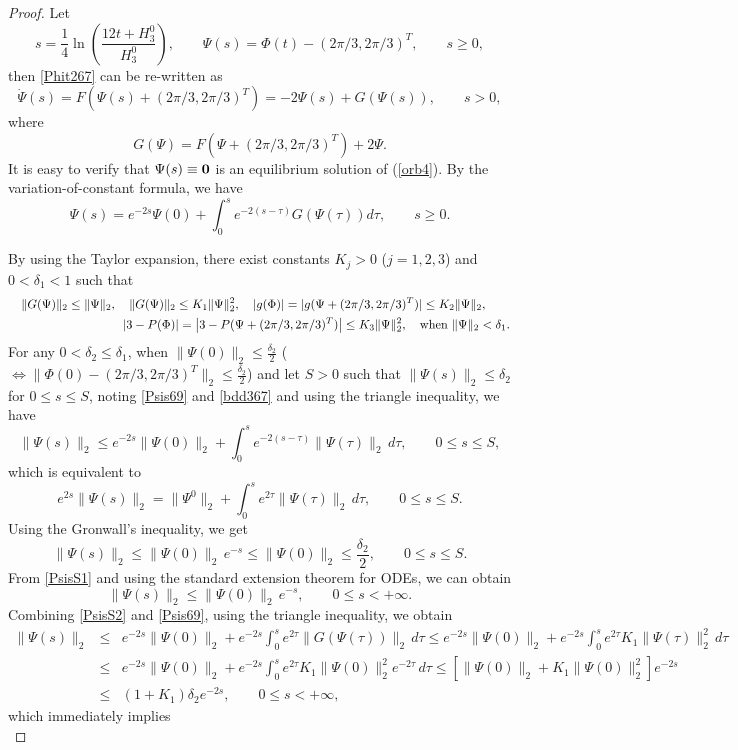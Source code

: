 \documentclass{aims}
\theoremstyle{plain}
\theoremstyle{definition}
\newcommand{\nn}{\nonumber}
\newcommand{\be} {\begin{equation}}
\newcommand{\ee}{\end{equation}}
\newcommand{\bea}{\begin{eqnarray}}
\newcommand{\eea}{\end{eqnarray} }
\begin{document}
\begin{proof}
Let
\be\label{st98}
s=\frac{1}{4}\ln \left(\frac{12t+H_3^0}{H_3^0}\right),\qquad
\Psi(s)=\Phi(t)-(2\pi/3,2\pi/3)^T, \qquad s\ge0,
\ee
then \eqref{Phit267} can be re-written as
\be\label{orb4}
\dot\Psi(s)=F\left(\Psi(s)+(2\pi/3,2\pi/3)^T\right)=-2 \Psi(s)+G(\Psi(s)),
\qquad s>0,
\ee
where
\be
G(\Psi)=F\left(\Psi+(2\pi/3,2\pi/3)^T\right)+2\Psi.\nonumber
\ee
It is easy to verify that $\Psi(s)\equiv {\bf 0}$ is
an equilibrium solution of (\ref{orb4}). By the variation-of-constant formula, we have
\be\label{Psis69}
\Psi(s)=e^{-2s}\Psi(0)+\int_0^s e^{-2(s-\tau)}
G(\Psi(\tau))d\tau, \qquad s\ge0.
\ee

By using the Taylor expansion, there exist constants $K_j>0$ ($j=1,2,3$) and $0<\delta_1<1$  such that
\bea\label{bdd367}
&&\|G(\Psi)\|_2\leq \|\Psi\|_2,\quad
\|G(\Psi)\|_2\leq K_1\|\Psi\|_2^2, \quad
|g(\Phi)|=|g(\Psi+(2\pi/3,2\pi/3)^T)|\leq K_2\|\Psi\|_2,\qquad \\
\label{bdd3671}
&&\left|3-P(\Phi)\right|=\left|3-P(\Psi+(2\pi/3,2\pi/3)^T)\right|\leq K_3\|\Psi\|_2^2, \quad \hbox{when}\ \|\Psi\|_2<\delta_1.
\eea
For any $0<\delta_2\le \delta_1$, when $\|\Psi(0)\|_2\le \frac{\delta_2}{2}$
($\Leftrightarrow \|\Phi(0)-(2\pi/3,2\pi/3)^T\|_2\le \frac{\delta_2}{2}$) and
let $S>0$ such that $\|\Psi(s)\|_2\le \delta_2$ for $0\le s\le S$, noting \eqref{Psis69} and \eqref{bdd367}
and using the triangle inequality, we have
\be
\|\Psi(s)\|_2\leq e^{-2s}\|\Psi(0)\|_2+\int_0^s e^{-2(s-\tau)}\| \Psi(\tau)\|_2\,d\tau, \qquad  0\leq s\le S,\nonumber
\ee
which is equivalent to
\be
e^{2s}\|\Psi(s)\|_2=\|\Psi^0\|_2+\int_0^s e^{2\tau}\|\Psi(\tau)\|_2\,d\tau,
\qquad 0\leq s\le S. \nonumber
\ee
Using the  Gronwall's inequality, we get
\be\label{PsisS1}
\|\Psi(s)\|_2\leq \| \Psi(0)\|_2\,e^{-s}\le \| \Psi(0)\|_2\le \frac{\delta_2}{2}, \qquad 0\leq s\le S.
\ee
From \eqref{PsisS1} and using the standard extension theorem for ODEs,
we can obtain
\be\label{PsisS2}
\|\Psi(s)\|_2\leq \| \Psi(0)\|_2\,e^{-s}, \qquad 0\leq s<+\infty.
\ee
Combining \eqref{PsisS2} and \eqref{Psis69}, using the triangle inequality, we obtain
\bea
\|\Psi(s)\|_2&\leq&e^{-2s}\|\Psi(0)\|_2+e^{-2s}\int_0^s e^{2\tau}\| G(\Psi(\tau))\|_2\,d\tau
\leq e^{-2s}\|\Psi(0)\|_2+e^{-2s}\int_0^s e^{2\tau}K_1\|\Psi(\tau)\|_2^2\,d\tau\nn\\
&\leq&e^{-2s}\|\Psi(0)\|_2+e^{-2s}\int_0^s e^{2\tau}K_1\|\Psi(0)\|_2^2e^{-2\tau}\,d\tau
\leq\left[\|\Psi(0)\|_2+K_1\|\Psi(0)\|_2^2\right]e^{-2s}\nn\\
&\le&(1+K_1)\delta_2 e^{-2s}, \qquad 0\leq s<+\infty,\nonumber
\eea
which immediately implies
\begin{equation}

\end{equation}
\end{proof}
\end{document}
